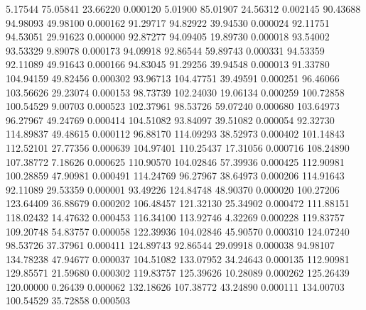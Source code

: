 	5.17544       75.05841       23.66220       0.000120
	5.01900       85.01907       24.56312       0.002145
       90.43688       94.98093       49.98100       0.000162
       91.29717       94.82922       39.94530       0.000024
       92.11751       94.53051       29.91623       0.000000
       92.87277       94.09405       19.89730       0.000018
       93.54002       93.53329        9.89078       0.000173
       94.09918       92.86544       59.89743       0.000331
       94.53359       92.11089       49.91643       0.000166
       94.83045       91.29256       39.94548       0.000013
       91.33780      104.94159       49.82456       0.000302
       93.96713      104.47751       39.49591       0.000251
       96.46066      103.56626       29.23074       0.000153
       98.73739      102.24030       19.06134       0.000259
      100.72858      100.54529        9.00703       0.000523
      102.37961       98.53726       59.07240       0.000680
      103.64973       96.27967       49.24769       0.000414
      104.51082       93.84097       39.51082       0.000054
       92.32730      114.89837       49.48615       0.000112
       96.88170      114.09293       38.52973       0.000402
      101.14843      112.52101       27.77356       0.000639
      104.97401      110.25437       17.31056       0.000716
      108.24890      107.38772        7.18626       0.000625
      110.90570      104.02846       57.39936       0.000425
      112.90981      100.28859       47.90981       0.000491
      114.24769       96.27967       38.64973       0.000206
      114.91643       92.11089       29.53359       0.000001
       93.49226      124.84748       48.90370       0.000020
      100.27206      123.64409       36.88679       0.000202
      106.48457      121.32130       25.34902       0.000472
      111.88151      118.02432       14.47632       0.000453
      116.34100      113.92746        4.32269       0.000228
      119.83757      109.20748       54.83757       0.000058
      122.39936      104.02846       45.90570       0.000310
      124.07240       98.53726       37.37961       0.000411
      124.89743       92.86544       29.09918       0.000038
       94.98107      134.78238       47.94677       0.000037
      104.51082      133.07952       34.24643       0.000135
      112.90981      129.85571       21.59680       0.000302
      119.83757      125.39626       10.28089       0.000262
      125.26439      120.00000        0.26439       0.000062
      132.18626      107.38772       43.24890       0.000111
      134.00703      100.54529       35.72858       0.000503
